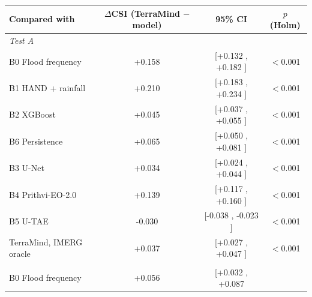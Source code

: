 \begin{tabular}{lccc}
\toprule
Compared with & $\Delta$CSI (TerraMind $-$ model) & 95\% CI & $p$ (Holm) \\
\midrule
\multicolumn{4}{l}{\textit{Test A}} \\
B0 Flood frequency
& +0.158%
& [+0.132%
, +0.182%
]
& $<$0.001%
\\
B1 HAND + rainfall
& +0.210%
& [+0.183%
, +0.234%
]
& $<$0.001%
\\
B2 XGBoost
& +0.045%
& [+0.037%
, +0.055%
]
& $<$0.001%
\\
B6 Persistence
& +0.065%
& [+0.050%
, +0.081%
]
& $<$0.001%
\\
B3 U-Net
& +0.034%
& [+0.024%
, +0.044%
]
& $<$0.001%
\\
B4 Prithvi-EO-2.0
& +0.139%
& [+0.117%
, +0.160%
]
& $<$0.001%
\\
B5 U-TAE
& -0.030%
& [-0.038%
, -0.023%
]
& $<$0.001%
\\
TerraMind, IMERG oracle
& +0.037%
& [+0.027%
, +0.047%
]
& $<$0.001%
\\
\addlinespace
\multicolumn{4}{l}{\textit{Test B}} \\
B0 Flood frequency
& +0.056%
& [+0.032%
, +0.087%

\end{tabular}
